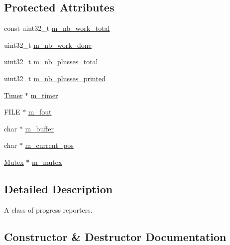 \subsection*{Protected Attributes}
\begin{DoxyCompactItemize}
\item 
const uint32\+\_\+t \hyperlink{classmage_1_1_progress_reporter_a1b0c8d8f3cde82161b34897c5e95e09b}{m\+\_\+nb\+\_\+work\+\_\+total}
\item 
uint32\+\_\+t \hyperlink{classmage_1_1_progress_reporter_ad3cb941594f138c208fa522a355a985b}{m\+\_\+nb\+\_\+work\+\_\+done}
\item 
uint32\+\_\+t \hyperlink{classmage_1_1_progress_reporter_aeae54fa7c542ccfbdaa44c0942c483fd}{m\+\_\+nb\+\_\+plusses\+\_\+total}
\item 
uint32\+\_\+t \hyperlink{classmage_1_1_progress_reporter_a17d7a4f8b2c8a6de255786f6165726bd}{m\+\_\+nb\+\_\+plusses\+\_\+printed}
\item 
\hyperlink{classmage_1_1_timer}{Timer} $\ast$ \hyperlink{classmage_1_1_progress_reporter_aaca483b46968f0d39262305b5400a3e1}{m\+\_\+timer}
\item 
F\+I\+LE $\ast$ \hyperlink{classmage_1_1_progress_reporter_ad325ee5978fd1d16a97acbe37a977982}{m\+\_\+fout}
\item 
char $\ast$ \hyperlink{classmage_1_1_progress_reporter_a3aa49d5b886263402d9a9ecb4851670c}{m\+\_\+buffer}
\item 
char $\ast$ \hyperlink{classmage_1_1_progress_reporter_a7adafaaf90edf29c8c27f4008aea41c9}{m\+\_\+current\+\_\+pos}
\item 
\hyperlink{classmage_1_1_mutex}{Mutex} $\ast$ \hyperlink{classmage_1_1_progress_reporter_abda37942e51b682b2871e49883d58da1}{m\+\_\+mutex}
\end{DoxyCompactItemize}


\subsection{Detailed Description}
A class of progress reporters. 

\subsection{Constructor \& Destructor Documentation}
\hypertarget{classmage_1_1_progress_reporter_a653b44699526baa17702cccd0fa58f78}{}\label{classmage_1_1_progress_reporter_a653b44699526baa17702cccd0fa58f78} 
